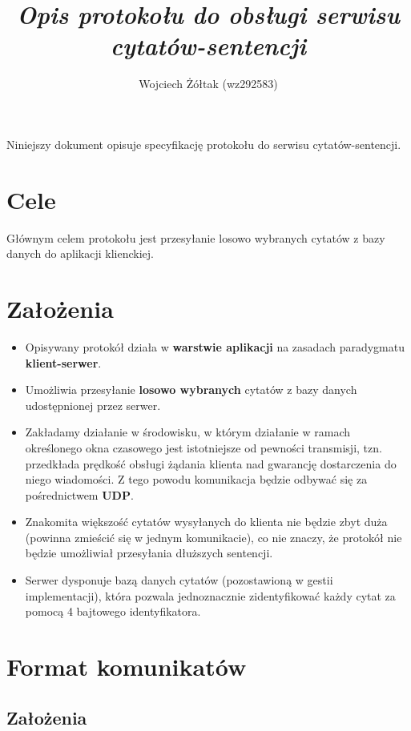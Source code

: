 \documentclass[a4paper,11pt,titlepage]{article}
\author{Wojciech Żółtak (wz292583)}
\title{\emph{Opis protokołu do obsługi serwisu cytatów-sentencji}}
\begin{document}
\maketitle

Niniejszy dokument opisuje specyfikację protokołu do serwisu
cytatów-sentencji.

\section{Cele}
Głównym celem protokołu jest przesyłanie losowo wybranych cytatów z
bazy danych do aplikacji klienckiej.

\section{Założenia}

\begin{itemize}
\item Opisywany protokół działa w {\bf warstwie aplikacji} na zasadach
      paradygmatu {\bf klient-serwer}.
\item Umożliwia przesyłanie {\bf losowo wybranych} cytatów z bazy danych
      udostępnionej przez serwer.
\item Zakładamy działanie w środowisku, w którym działanie w ramach
      określonego okna czasowego jest istotniejsze od pewności transmisji,
      tzn. przedkłada prędkość obsługi żądania klienta nad gwarancję
      dostarczenia do niego wiadomości. Z tego powodu komunikacja będzie
      odbywać się za pośrednictwem {\bf UDP}.
\item Znakomita większość cytatów wysyłanych do klienta nie będzie zbyt
      duża (powinna zmieścić się w jednym komunikacie), co nie znaczy, że
      protokół nie będzie umożliwiał przesyłania dłuższych sentencji.
\item Serwer dysponuje bazą danych cytatów (pozostawioną w gestii
      implementacji), która pozwala jednoznacznie zidentyfikować każdy cytat
      za pomocą 4 bajtowego identyfikatora.
\end{itemize}


\section{Format komunikatów}

\subsection{Założenia}
\end{document}
